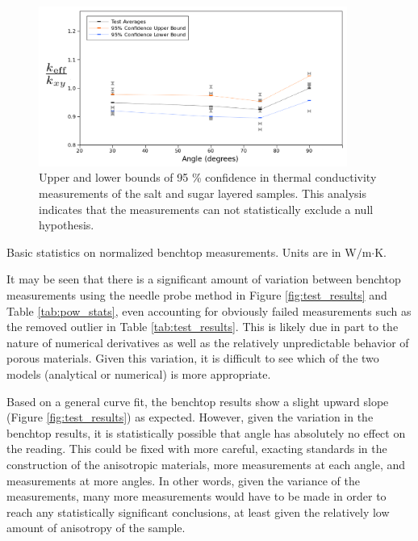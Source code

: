 \begin{figure}[h]
\centering
\includegraphics[width=0.9\textwidth]{fig/test_results_confidence.png}
\caption{Upper and lower bounds of 95 \% confidence in thermal conductivity measurements of the salt and sugar layered samples. This analysis 
indicates that the measurements can not statistically exclude a null hypothesis.}
\label{fig:test_confidence}
\end{figure}

\begin{table}[h]
\centering

\caption{Basic statistics on normalized benchtop measurements.  Units are in W\(/\)m\(\cdot\)K.}
\label{tab:pow-stats}
\end{table}


It may be seen that there is a significant amount of variation between
benchtop measurements using the needle probe method in Figure \ref{fig:test_results} and Table \ref{tab:pow_stats}, even accounting for obviously failed measurements such as the removed outlier in Table \ref{tab:test_results}.
This is likely due in part to the nature of numerical derivatives as well as the relatively
unpredictable behavior of porous materials. Given
this variation, it is difficult to see which of the two models (analytical or numerical) is more appropriate.

Based on a general curve fit, the benchtop results show a slight upward slope (Figure \ref{fig:test_results}) as
expected. However, given the variation in the benchtop results, it is statistically
possible that angle has absolutely no effect on the reading. This could be fixed
with more careful, exacting standards in the construction of the anisotropic
materials, more measurements at each angle, and measurements at more angles.
In other words, given the variance of the measurements, many more measurements
would have to be made in order to reach any statistically significant
conclusions, at least given the relatively low amount of anisotropy of the sample.

